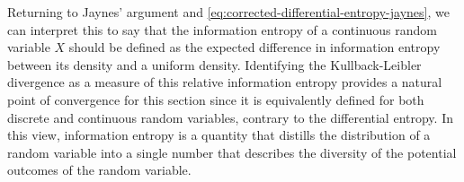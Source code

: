 Returning to Jaynes' argument and \cref{eq:corrected-differential-entropy-jaynes}, we can interpret this to say that the information entropy of a continuous random variable $X$ should be defined as the expected difference in information entropy between its density and a uniform density. 
Identifying the Kullback-Leibler divergence as a measure of this relative information entropy provides a natural point of convergence for this section since it is equivalently defined for both discrete and continuous random variables, contrary to the differential entropy. 
In this view, information entropy is a quantity that distills the distribution of a random variable into a single number that describes the diversity of the potential outcomes of the random variable. 



